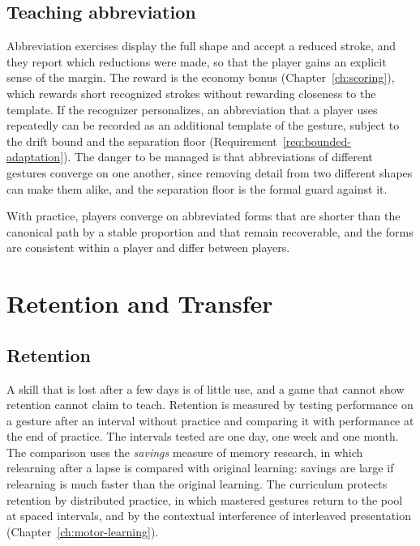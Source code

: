 \section{Teaching abbreviation}

Abbreviation exercises display the full shape and accept a reduced stroke, and they report which reductions were made, so that the player gains an explicit sense of the margin. The reward is the economy bonus (Chapter~\ref{ch:scoring}), which rewards short recognized strokes without rewarding closeness to the template. If the recognizer personalizes, an abbreviation that a player uses repeatedly can be recorded as an additional template of the gesture, subject to the drift bound and the separation floor (Requirement~\ref{req:bounded-adaptation}). The danger to be managed is that abbreviations of different gestures converge on one another, since removing detail from two different shapes can make them alike, and the separation floor is the formal guard against it.

\begin{hypothesis}\label{hyp:abbreviation}
With practice, players converge on abbreviated forms that are shorter than the canonical path by a stable proportion and that remain recoverable, and the forms are consistent within a player and differ between players.\evH
\end{hypothesis}

\chapter{Retention and Transfer}\label{ch:retention}

\section{Retention}

A skill that is lost after a few days is of little use, and a game that cannot show retention cannot claim to teach. Retention is measured by testing performance on a gesture after an interval without practice and comparing it with performance at the end of practice. The intervals tested are one day, one week and one month. The comparison uses the \emph{savings} measure of memory research, in which relearning after a lapse is compared with original learning: savings are large if relearning is much faster than the original learning. The curriculum protects retention by distributed practice, in which mastered gestures return to the pool at spaced intervals, and by the contextual interference of interleaved presentation (Chapter~\ref{ch:motor-learning}).

